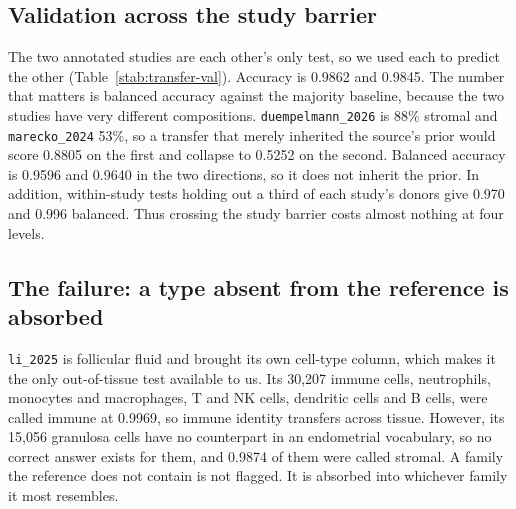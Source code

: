 \begin{table}[t]
\centering
\caption[The transfer's neighbourhoods]{\textbf{Properties of the
937{,}122 transferred neighbourhoods.} The last three rows are the
distances behind Supplementary Fig.~\ref{sfig:transfer-dist}.}
\label{stab:transfer-nbhd}
\small

\end{table}

\subsection{Validation across the study barrier}

The two annotated studies are each other's only test, so we used each to
predict the other (Table~\ref{stab:transfer-val}). Accuracy is 0.9862 and
0.9845. The number that matters is balanced accuracy against the majority
baseline, because the two studies have very different compositions.
\texttt{duempelmann\_2026} is 88\% stromal and \texttt{marecko\_2024} 53\%,
so a transfer that merely inherited the source's prior would score 0.8805
on the first and collapse to 0.5252 on the second. Balanced accuracy is
0.9596 and 0.9640 in the two directions, so it does not inherit the prior.
In addition, within-study tests holding out a third of each study's donors
give 0.970 and 0.996 balanced. Thus crossing the study barrier costs almost
nothing at four levels.

\begin{table}[t]
\centering
\caption[Transfer validation]{\textbf{Validation of the transfer.} The two
cross-study rows predict one annotated study from the other; the two
\texttt{li\_2025} rows are the out-of-tissue test, computed on the final
transfer. Balanced accuracy weights the four families equally.}
\label{stab:transfer-val}
\small

\end{table}

\subsection{The failure: a type absent from the reference is absorbed}

\texttt{li\_2025} is follicular fluid and brought its own cell-type column,
which makes it the only out-of-tissue test available to us. Its 30{,}207
immune cells, neutrophils, monocytes and macrophages, T and NK cells,
dendritic cells and B cells, were called immune at 0.9969, so immune
identity transfers across tissue. However, its 15{,}056 granulosa cells
have no counterpart in an endometrial vocabulary, so no correct answer
exists for them, and 0.9874 of them were called stromal. A family the
reference does not contain is not flagged. It is absorbed into whichever
family it most resembles.

